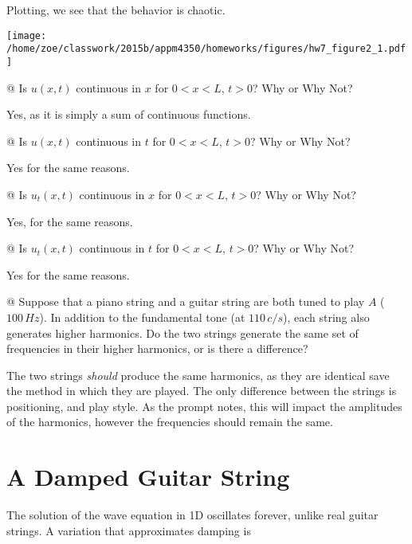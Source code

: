 \documentclass[10pt]{article}
\begin{document}
\begin{easylist}[enumerate]
    Plotting, we see that the behavior is chaotic.

\simpleweave

\texttt{[image: /home/zoe/classwork/2015b/appm4350/homeworks/figures/hw7\_figure2\_1.pdf]}

\nosimpleweave
    @ Is $u(x, t)$ continuous in $x$ for $0 < x < L$, $t > 0$? Why or Why Not?

    Yes, as it is simply a sum of continuous functions.

    @ Is $u(x, t)$ continuous in $t$ for $0 < x < L$, $t > 0$? Why or Why Not?

    Yes for the same reasons.

    @ Is $u_t(x, t)$ continuous in $x$ for $0 < x < L$, $t > 0$? Why or Why Not?

    Yes, for the same reasons.

    @ Is $u_t(x, t)$ continuous in $t$ for $0 < x < L$, $t > 0$? Why or Why Not?

    Yes for the same reasons.

    @ Suppose that a piano string and a guitar string are both tuned to play $A$ ($100 \, Hz$). In addition to the
    fundamental tone (at $110 \, c/s$), each string also generates higher harmonics. Do the two strings generate the
    same set of frequencies in their higher harmonics, or is there a difference?

    The two strings \textit{should} produce the same harmonics, as they are identical save the method in which they are
    played. The only difference between the strings is positioning, and play style. As the prompt notes, this will
    impact the amplitudes of the harmonics, however the frequencies should remain the same.
\end{easylist}

\newpage
\section{A Damped Guitar String}

The solution of the wave equation in 1D oscillates forever, unlike real guitar strings. A variation that approximates
damping is

\end{document}

